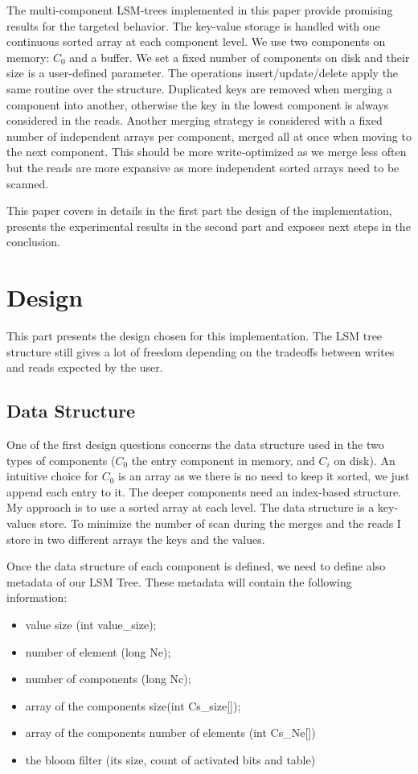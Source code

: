 \documentclass{sig-alternate-05-2015}
\begin{document}
The multi-component LSM-trees implemented in this paper provide promising results for the targeted behavior. The key-value storage is handled with one continuous sorted array at each component level. We use two components on memory: $C_0$ and a buffer. We set a fixed number of components on disk and their size is a user-defined parameter. The operations insert/update/delete apply the same routine over the structure. Duplicated keys are removed when merging a component into another, otherwise the key in the lowest component is always considered in the reads. Another merging strategy is considered with a fixed number of independent arrays per component, merged all at once when moving to the next component. This should be more write-optimized as we merge less often but the reads are more expansive as more independent sorted arrays need to be scanned.

This paper covers in details in the first part the design of the implementation, presents the experimental results in the second part and exposes next steps in the conclusion.

\section{Design}

This part presents the design chosen for this implementation. The LSM tree structure still gives a lot of freedom depending on the tradeoffs between writes and reads expected by the user.

\subsection{Data Structure}

One of the first design questions concerns the data structure used in the two types of components ($C_0$ the entry component in memory, and $C_i$ on disk). An intuitive choice for $C_0$ is an array as we there is no need to keep it sorted, we just append each entry to it. The deeper components need an index-based structure. My approach is to use a sorted array at each level. The data structure is a key-values store. To minimize the number of scan during the merges and the reads I store in two different arrays the keys and the values.

Once the data structure of each component is defined, we need to define also metadata of our LSM Tree. These metadata will contain the following information:
\begin{itemize}
	\item value size (int value\_size);
	\item number of element (long Ne);
	\item number of components (long Nc);
	\item array of the components size(int Cs\_size[]);
	\item array of the components number of elements (int Cs\_Ne[])
	\item the bloom filter (its size, count of activated bits and table)
\end{itemize}
			
\end{document}
